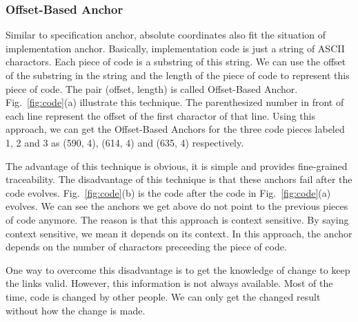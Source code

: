 \subsubsection{Offset-Based Anchor}

Similar to specification anchor,
absolute coordinates also fit the situation of implementation anchor.
Basically, implementation code is just a string of ASCII charactors. 
Each piece of code is a substring of this string.
We can use the offset of the substring in the string and the length of the piece of code to represent this piece of code.
The pair (offset, length) is called Offset-Based Anchor.
Fig.~\ref{fig:code}(a) illustrate this technique.
The parenthesized number in front of each line represent the offset of the first charactor of that line.
Using this approach, we can get the Offset-Based Anchors for the three code pieces labeled 1, 2 and 3 as (590, 4), (614, 4) and (635, 4) respectively.

The advantage of this technique is obvious, it is simple and provides fine-grained traceability. The disadvantage of this technique is that these anchors fail after the code evolves. Fig.~\ref{fig:code}(b) is the code after the code in Fig.~\ref{fig:code}(a) evolves. We can see the anchors we get above do not point to the previous pieces of code anymore. The reason is that this approach is context sensitive. By saying context sensitive, we mean it depends on its context. In this approach, the anchor depends on the number of charactors preceeding the piece of code.

One way to overcome this disadvantage is to get the knowledge of change to keep the links valid. However, this information is not always available. Most of the time, code is changed by other people. We can only get the changed result without how the change is made.

